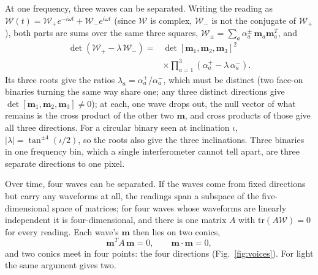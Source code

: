 At one frequency, three waves can be separated. Writing the reading as
$\mathcal{W}(t) = \mathcal{W}_+e^{-i\omega t} + \mathcal{W}_-e^{i\omega t}$ (since $\mathcal W$ is
complex, $\mathcal W_-$ is not the conjugate of $\mathcal W_+$), both parts are sums
over the same three squares, $\mathcal{W}_\pm = \sum_a \alpha_a^\pm\,
\mathbf{m}_a\mathbf{m}_a^{T}$, and
\begin{equation}\label{eq:pencil}
\begin{aligned}
\det(\mathcal{W}_+ - \lambda\,\mathcal{W}_-) ={}& \det[\mathbf{m}_1,\mathbf{m}_2,\mathbf{m}_3]^2\\
&\times\prod_{a=1}^{3}(\alpha^+_a - \lambda\,\alpha^-_a) .
\end{aligned}
\end{equation}
Its three roots give the ratios $\lambda_a = \alpha_a^+/\alpha_a^-$, which must be
distinct (two face-on binaries turning the same way share one; any three distinct
directions give $\det[\mathbf m_1,\mathbf m_2,\mathbf m_3] \neq 0$); at each, one
wave drops out, the null vector of what remains is the cross product of the other
two $\mathbf{m}$, and cross products of those give all three directions. For a
circular binary seen at inclination $\iota$, $|\lambda| = \tan^{\pm4}(\iota/2)$,
so the roots also give the three inclinations. Three binaries in one frequency
bin, which a single interferometer cannot tell apart, are three separate
directions to one pixel.

Over time, four waves can be separated. If the waves come from fixed directions but carry any
waveforms at all, the readings span a subspace of the five-dimensional space of
matrices; for four waves whose waveforms are linearly independent it is
four-dimensional, and there is one matrix $A$ with
$\mathrm{tr}(A\mathcal{W}) = 0$ for every reading. Each wave's $\mathbf{m}$ then lies on
two conics,
\begin{equation}\label{eq:four-waves}
\mathbf{m}^{T}\!A\,\mathbf{m} = 0, \qquad \mathbf{m}\cdot\mathbf{m} = 0 ,
\end{equation}
and two conics meet in four points: the four directions (Fig.~\ref{fig:voices}).
For light the same argument gives two.

